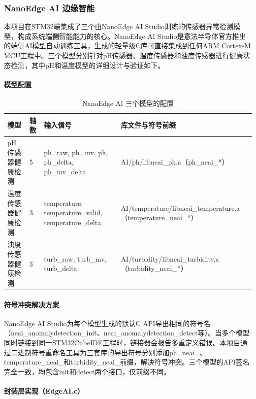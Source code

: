 \documentclass[12pt,a4paper]{ctexart}
\begin{document}
\subsubsection{NanoEdge AI 边缘智能}

本项目在STM32端集成了三个由NanoEdge AI Studio训练的传感器异常检测模型，构成系统端侧智能能力的核心。NanoEdge AI Studio是意法半导体官方推出的端侧AI模型自动训练工具，生成的轻量级C库可直接集成到任何ARM Cortex-M MCU工程中。三个模型分别针对pH传感器、温度传感器和浊度传感器进行健康状态检测，其中pH和温度模型的详细设计与验证如下。

\paragraph{模型配置}

\begin{table}[H]
\centering
\caption{NanoEdge AI 三个模型的配置}
\label{tab:neai}
\begin{tabular}{p{3.2cm}p{1.5cm}p{3cm}p{5cm}}
\toprule
\textbf{模型} & \textbf{轴数} & \textbf{输入信号} & \textbf{库文件与符号前缀} \\
\midrule
pH传感器健康检测 & 5 & ph\_raw, ph\_mv, ph, ph\_delta, ph\_mv\_delta & AI/ph/libneai\_ph.a（ph\_neai\_*） \\
温度传感器健康检测 & 3 & temperature, temperature\_valid, temperature\_delta & AI/temperature/libneai\_temperature.a（temperature\_neai\_*） \\
浊度传感器健康检测 & 3 & turb\_raw, turb\_mv, turb\_delta & AI/turbidity/libneai\_turbidity.a（turbidity\_neai\_*） \\
\bottomrule
\end{tabular}
\end{table}

\paragraph{符号冲突解决方案}

NanoEdge AI Studio为每个模型生成的默认C API导出相同的符号名（neai\_anomalydetection\_init、neai\_anomalydetection\_detect等）。当多个模型同时链接到同一STM32CubeIDE工程时，链接器会报告多重定义错误。本项目通过二进制符号重命名工具为三套库的导出符号分别添加ph\_neai\_、temperature\_neai\_和turbidity\_neai\_前缀，解决符号冲突。三个模型的API签名完全一致，均包含init和detect两个接口，仅前缀不同。

\paragraph{封装层实现（EdgeAI.c）}
\end{document}
